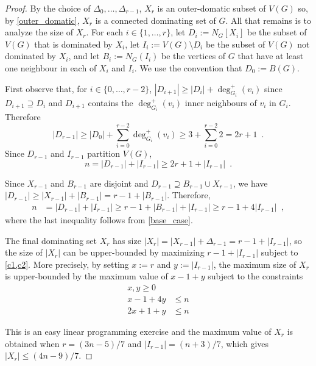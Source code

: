 \documentclass[a4paper,UKenglish, cleveref, autoref, thm-restate]{lipics-v2021}
\begin{document}
\begin{proof}
By the choice of $\Delta_0,\ldots,\Delta_{r-1}$, $X_r$ is an outer-domatic subset of $V(G)$ so, by \cref{outer_domatic}, $X_r$ is a connected dominating set of $G$.  All that remains is to analyze the size of $X_r$.  For each $i\in\{1,\ldots,r\}$, let $D_i:=N_G[X_i]$ be the subset of $V(G)$ that is dominated by $X_i$, let $I_i:=V(G)\setminus D_i$ be the subset of $V(G)$ not dominated by $X_i$, and let $B_i:=N_G(I_i)$ be the vertices of $G$ that have at least one neighbour in each of $X_i$ and $I_i$.  We use the convention that $D_0:=B(G)$.

First observe that, for $i\in\{0,\ldots,r-2\}$, $|D_{i+1}|\ge |D_i|+\deg_{G_i}^+(v_i)$ since $D_{i+1}\supseteq D_i$ and $D_{i+1}$ contains the $\deg_{G_i}^+(v_i)$ inner neighbours of $v_i$ in $G_i$.  Therefore
\[
    |D_{r-1}| \ge |D_0| + \sum_{i=0}^{r-2} \deg_{G_i}^+(v_i) \ge 3 + \sum_{i=0}^{r-2} 2 =  2r+1 \enspace . \label{double_d}
\]
Since $D_{r-1}$ and $I_{r-1}$ partition $V(G)$,
\begin{equation}
  n = |D_{r-1}| + |I_{r-1}| \ge 2r+1 + |I_{r-1}|  \enspace . \label{c1}
\end{equation}

Since $X_{r-1}$ and $B_{r-1}$ are disjoint and $D_{r-1}\supseteq B_{r-1}\cup X_{r-1}$, we have $|D_{r-1}|\ge |X_{r-1}| + |B_{r-1}|=r-1+|B_{r-1}|$.  Therefore,
\begin{align}
    n & = |D_{r-1}| + |I_{r-1}| \ge r-1 + |B_{r-1}| + |I_{r-1}| \ge r - 1 + 4|I_{r-1}| \enspace , \label{c2}
\end{align}
where the last inequality follows from \cref{base_case}.

The final dominating set $X_r$ has size $|X_r| = |X_{r-1}| + \Delta_{r-1} = r - 1 +|I_{r-1}|$, so the size of $|X_r|$ can be upper-bounded by maximizing $r-1+|I_{r-1}|$ subject to \cref{c1,c2}.  More precisely, by setting $x:=r$ and $y:=|I_{r-1}|$, the maximum size of $X_r$ is upper-bounded by the maximum value of $x-1+y$ subject to the constraints
\begin{align*}
x,y \ge 0 \\
  x - 1 + 4y & \le n \\
  2x + 1 + y & \le n
\end{align*}

This is an easy linear programming exercise and the maximum value of $X_{r}$ is obtained when $r=(3n-5)/7$ and $|I_{r-1}|=(n+3)/7$, which gives
$|X_r| \le (4n-9)/7$.
\end{proof}
\end{document}
